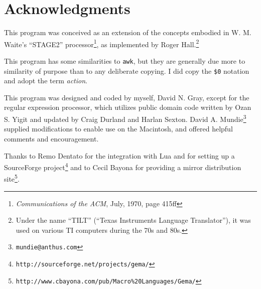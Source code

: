 \section{Acknowledgments}

This program was conceived as an extension of the concepts
embodied in W. M. Waite's ``STAGE2'' processor\footnote{{\em
Communications of the ACM}, July, 1970, page 415ff}, as implemented by
Roger Hall.\footnote{Under the name ``TILT'' (``Texas Instruments
Language Translator''), it was used on various TI computers during the
70s and 80s.}

This program has some similarities to {\tt awk}, but
they are generally due more to similarity of purpose than to any
deliberate copying.  I did copy the \verb/$0/ notation and adopt the term
{\em action}.

This program was designed and coded by myself, David N. Gray, except for the
regular expression processor, which utilizes public domain code written
by Ozan S. Yigit and updated by Craig Durland and Harlan Sexton.
David A. Mundie\footnote{\tt mundie@anthus.com} supplied modifications
to enable use on the Macintosh, and offered helpful comments and encouragement.

Thanks to Remo Dentato for the integration with Lua and for setting up a
SourceForge project\footnote{\tt http://sourceforge.net/projects/gema/}
and to Cecil Bayona for providing a mirror distribution 
site\footnote{\tt http://www.cbayona.com/pub/Macro\%20Languages/Gema/}.
